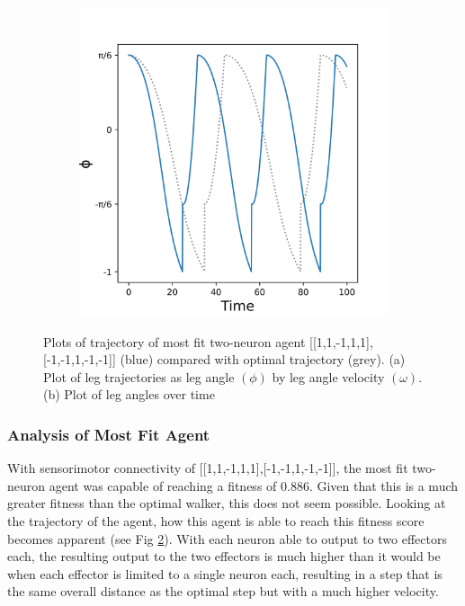 \documentclass{article}
\begin{document}
\begin{figure}[htbp]
\begin{subfigure}[b]{0.5\textwidth}
    \includegraphics[width=\textwidth]{../plots/angleTime2_224_18.png}
    \caption{}
    \label{fig:AngleTimePlot2Best}
  \end{subfigure}
  \caption{Plots of trajectory of most fit two-neuron agent [[1,1,-1,1,1],[-1,-1,1,-1,-1]] (blue) compared with optimal trajectory (grey). (a) Plot of leg trajectories as leg angle \((\phi)\) by leg angle velocity \((\omega)\). (b) Plot of leg angles over time}
  \label{fig:plots2Best}
\end{figure} 

\subsubsection{Analysis of Most Fit Agent}

With sensorimotor connectivity of [[1,1,-1,1,1],[-1,-1,1,-1,-1]], the most fit two-neuron agent was capable of reaching a fitness of 0.886. Given that this is a much greater fitness than the optimal walker, this does not seem possible. Looking at the trajectory of the agent, how this agent is able to reach this fitness score becomes apparent (see Fig \ref{fig:plots2Best}). With each neuron able to output to two effectors each, the resulting output to the two effectors is much higher than it would be when each effector is limited to a single neuron each, resulting in a step that is the same overall distance as the optimal step but with a much higher velocity. 
\end{document}
